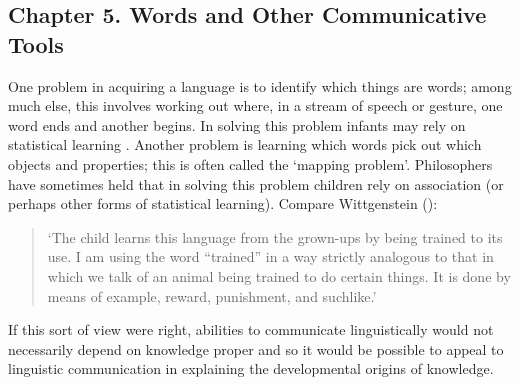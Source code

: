 \documentclass[12pt,\papersize]{extarticle}
\begin{document}
\subsection{Chapter 5. Words and Other Communicative Tools}
One problem in acquiring a language is to identify which things are words; among much else, this involves working out where, in a stream of speech or gesture, one word ends and another begins.  
In solving this problem infants may rely on statistical learning \citep{Saffran:1996aj}.
Another problem is learning which words pick out which objects and properties; this is often called the `mapping problem'. 
Philosophers have sometimes held that in solving this problem children rely on association (or perhaps other forms of statistical learning).
Compare Wittgenstein (\citeyear[p.\ 77]{Wittgenstein:1972lj}): 
%
\begin{quote}
`The child learns this language from the grown-ups by being trained to its use. I am using the word ``trained'' in a way strictly analogous to that in which we talk of an animal being trained to do certain things. It is done by means of example, reward, punishment, and suchlike.'
%
\end{quote}
%
If this sort of view were right, abilities to communicate linguistically would not necessarily depend on knowledge proper and so it would be possible to appeal to linguistic communication in explaining the developmental origins of knowledge. 
\end{document}
